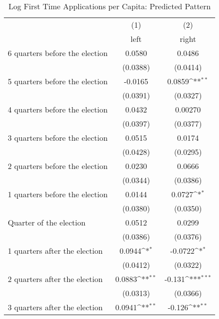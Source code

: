 \begin{table}[htbp]\centering
\def\sym#1{\ifmmode^{#1}\else\(^{#1}\)\fi}
\caption{Log First Time Applications per Capita: Predicted Pattern}
\begin{tabular}{l*{2}{c}}
\hline\hline
                    &\multicolumn{1}{c}{(1)}&\multicolumn{1}{c}{(2)}\\
                    &\multicolumn{1}{c}{left}&\multicolumn{1}{c}{right}\\
\hline
 6 quarters before the election&      0.0580         &      0.0486         \\
                    &    (0.0388)         &    (0.0414)         \\
[1em]
 5 quarters before the election&     -0.0165         &      0.0859\sym{**} \\
                    &    (0.0391)         &    (0.0327)         \\
[1em]
 4 quarters before the election&      0.0432         &     0.00270         \\
                    &    (0.0397)         &    (0.0377)         \\
[1em]
 3 quarters before the election&      0.0515         &      0.0174         \\
                    &    (0.0428)         &    (0.0295)         \\
[1em]
 2 quarters before the election&      0.0230         &      0.0666         \\
                    &    (0.0344)         &    (0.0386)         \\
[1em]
 1 quarters before the election&      0.0144         &      0.0727\sym{*}  \\
                    &    (0.0380)         &    (0.0350)         \\
[1em]
Quarter of the election&      0.0512         &      0.0299         \\
                    &    (0.0386)         &    (0.0376)         \\
[1em]
 1 quarters after the election&      0.0944\sym{*}  &     -0.0722\sym{*}  \\
                    &    (0.0412)         &    (0.0322)         \\
[1em]
 2 quarters after the election&      0.0883\sym{**} &      -0.131\sym{***}\\
                    &    (0.0313)         &    (0.0366)         \\
[1em]
 3 quarters after the election&      0.0941\sym{**} &      -0.126\sym{**} \\

\end{tabular}
\end{table}
